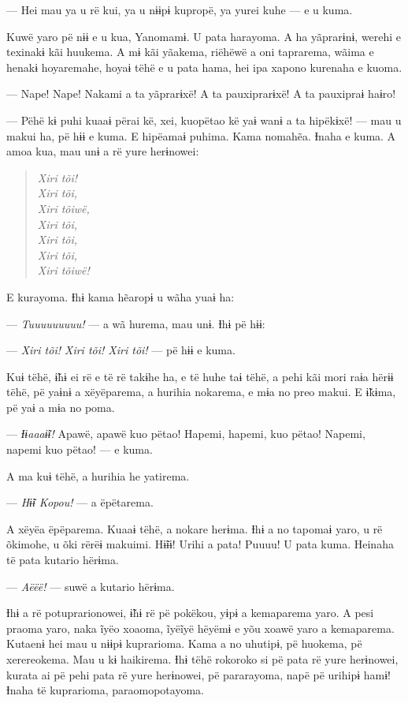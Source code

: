 --- Hei mau ya u rë kui, ya u nɨɨpɨ kupropë, ya yurei kuhe --- e u kuma. 

Kuwë yaro pë nɨɨ e u kua, Yanomamɨ. U pata harayoma. A ha yãprarɨnɨ,
werehi e texinakɨ kãi huukema. A mɨ kãi yãakema, riëhëwë a oni
taprarema, wãima e henakɨ hoyaremahe, hoyaɨ tëhë e u pata hama, hei ipa
xapono kurenaha e kuoma. 

--- Nape! Nape! Nakami a ta yãprarɨxë! A ta pauxiprarɨxë! A ta pauxipraɨ
haɨro! 

--- Pëhë kɨ puhi kuaaɨ përai kë, xei, kuopëtao kë yaɨ wanɨ a ta hipëkɨxë!
--- mau u makui ha, pë hɨɨ e kuma. E hipëamaɨ puhima. Kama nomahẽa.
Ɨnaha e kuma. A amoa kua, mau unɨ a rë yure herɨnowei: 

\enlargethispage{\baselineskip}
\begin{verse}
\textit{Xiri tõi!\\
Xiri tõi,\\
Xiri tõiwë,\\
Xiri tõi,\\
Xiri tõi,\\
Xiri tõi,\\
Xiri tõiwë!}
\end{verse}

E kurayoma. Ɨhɨ kama hẽaropɨ u wãha yuaɨ ha: 

--- \textit{Tuuuuuuuuu!} --- a wã hurema, mau unɨ. Ɨhɨ pë hɨɨ: 

--- \textit{Xiri tõi! Xiri tõi! Xiri tõi!} --- pë hɨɨ e kuma. 

Kuɨ tëhë, ɨ̃hɨ ei rë e të rë takɨhe ha, e të huhe taɨ tëhë, a pehi kãi
mori raɨa hërɨɨ tëhë, pë yaɨnɨ a xëyëparema, a hurihia nokarema, e mɨa
no preo makui. E ɨ̃kɨma, pë yaɨ a mɨa no poma. 

--- \textit{Ɨɨaaaɨ̃ɨ!} Apawë, apawë kuo pëtao! Hapemi, hapemi, kuo pëtao! Napemi,
napemi kuo pëtao! --- e kuma. 

A ma kuɨ tëhë, a hurihia he yatirema. 

--- \textit{Hɨ̃ɨ Kopou!} --- a ëpëtarema. 

A xëyëa ëpëparema. Kuaaɨ tëhë, a nokare herɨma. Ɨhɨ a no tapomaɨ yaro, u
rë õkimohe, u õki rërëɨ makuimi. Hɨ̃ɨɨ! Urihi a pata! Puuuu! U pata kuma.
Heinaha të pata kutario hërɨma.

--- \textit{Aëëë!} --- suwë a kutario hërɨma. 

Ɨhɨ a rë potuprarionowei, ɨ̃hɨ rë pë pokëkou, yɨpɨ a kemaparema yaro. A pesi praoma yaro, naka ĩyëo xoaoma, ĩyëĩyë hëyëmɨ e yõu xoawë yaro a
kemaparema. Kutaenɨ hei mau u nɨɨpɨ kuprarioma. Kama a no uhutipɨ, pë
huokema, pë xerereokema. Mau u kɨ haikirema. Ɨhɨ tëhë rokoroko si pë
pata rë yure herɨnowei, kurata ai pë pehi pata rë yure herɨnowei, pë
pararayoma, napë pë urihipɨ hamɨ! Ɨnaha të kuprarioma, paraomopotayoma.

